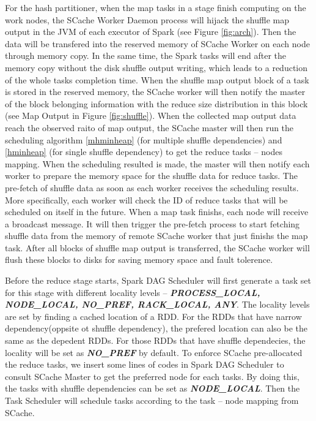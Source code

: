 \documentclass[10pt,twocolumn]{article}
\begin{document}
For the hash partitioner, when the map tasks in a stage finish computing on the work nodes, the  SCache Worker Daemon process will hijack the shuffle map output in the JVM of each executor of Spark (see Figure \ref{fig:arch}). Then the data will be transfered into the reserved memory of SCache Worker on each node through memory copy. In the same time, the Spark tasks will end after the memory copy without the disk shuffle output writing, which leads to a  reduction of the whole tasks completion time. When the shuffle map output block of a task is stored in the reserved memory, the SCache worker will then notify the master of the block belonging information with the reduce size distribution in this block (see Map Output in Figure \ref{fig:shuffle}). When the collected map output data reach the observed raito of map output, the SCache master will then run the scheduling algorithm \ref{mhminheap} (for multiple shuffle dependencies) and \ref{hminheap} (for single shuffle dependency) to get the reduce tasks -- nodes mapping. When the scheduling resulted is made, the master will then notify each worker to prepare the memory space for the shuffle data for reduce tasks. The pre-fetch of shuffle data as soon as each worker receives the scheduling results. More specifically, each worker will check the ID of reduce tasks that will be scheduled on itself in the future. When a map task finishs, each node will receive a broadcast message. It will then trigger the pre-fetch process to start fetching shuffle data from the memory of remote SCache worker that just finishs the map task. After all blocks of shuffle map output is transferred, the SCache worker will flush these blocks to disks for saving memory space and fault tolerence. 

Before the reduce stage starts, Spark DAG Scheduler will first generate a task set for this stage with different locality levels -- \textbf{\textit{PROCESS\_LOCAL, NODE\_LOCAL, NO\_PREF, RACK\_LOCAL, ANY}}. The locality levels are set by finding a cached location of a RDD. For the RDDs that have narrow dependency(oppsite ot shuffle dependency), the prefered location can also be the same as the depedent RDDs. For those RDDs that have shuffle dependecies, the locality will be set as \textbf{\textit{NO\_PREF}} by default. To enforce SCache pre-allocated the reduce tasks, we insert some lines of codes in Spark DAG Scheduler to consult SCache Master to get the preferred node for each tasks. By doing this, the tasks with shuffle dependencies can be set as \textbf{\textit{NODE\_LOCAL}}. Then the Task Scheduler will schedule tasks according to the task -- node mapping from SCache. 
\end{document}
